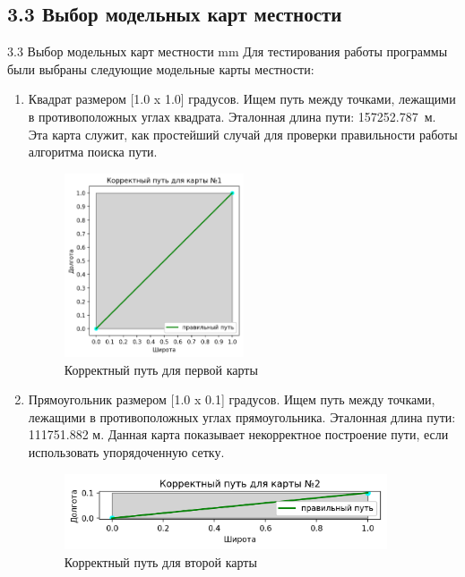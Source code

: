 \subsection*{\Large{3.3 Выбор модельных карт местности}}
 {3.3 Выбор модельных карт местности}
 mm
Для тестирования работы программы были выбраны следующие модельные карты местности:
\begin{enumerate}
	\item {
		Квадрат размером [1.0 x 1.0] градусов. Ищем путь между точками, лежащими в противоположных углах квадрата. Эталонная длина пути: \mbox{157252.787 м.} Эта карта служит, как простейший случай для проверки правильности работы алгоритма поиска пути.
		\begin{figure}[H]
		    \includegraphics[width=0.5\textwidth]{images/3_1.png}
			\caption{Корректный путь для первой карты}
			\label{pic:correct_first}
		\end{figure}
	\vspace{2mm}
	}
	\item {
		Прямоугольник размером [1.0 x 0.1] градусов. Ищем путь между точками, лежащими в противоположных углах прямоугольника. Эталонная длина пути: 111751.882 м. Данная карта показывает некорректное построение пути, если использовать упорядоченную сетку.
		\begin{figure}[H]
			\includegraphics[width=0.9\textwidth]{images/3_2.png}
			\caption{Корректный путь для второй карты}
			\label{pic:correct_second}
		\end{figure}
	\vspace{2mm}
}
\end{enumerate}
